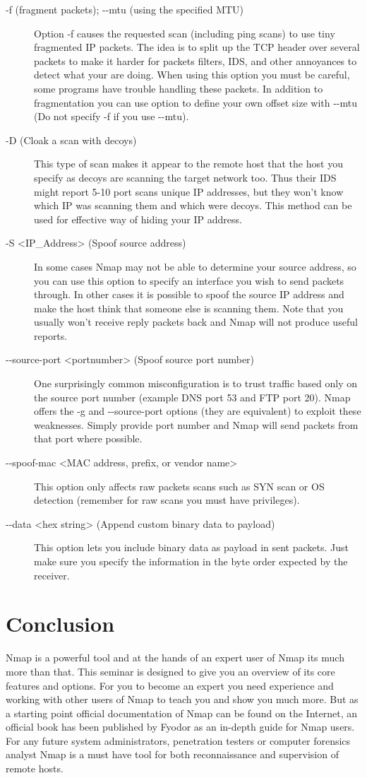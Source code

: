 \documentclass[times, utf8, seminar,english]{fer}
\begin{document}
\begin{description}
	\item [-f (fragment packets); -{}-mtu (using the specified MTU)] Option -f causes the requested scan (including ping scans) to use tiny fragmented IP packets. The idea is to split up the TCP header over several packets to make it harder for packets filters, IDS, and other annoyances to detect what your are doing. When using this option you must be careful, some programs have trouble handling these packets. In addition to fragmentation you can use option to define your own offset size with -{}-mtu (Do not specify -f if you use -{}-mtu). 
	\item [-D (Cloak a scan with decoys)] This type of scan makes it appear to the remote host that the host you specify as decoys are scanning the target network too. Thus their IDS might report 5-10 port scans unique IP addresses, but they won't know which IP was scanning them and which were decoys. This method can be used for effective way of hiding your IP address.
	\item [-S <IP\_Address> (Spoof source address)] In some cases Nmap may not be able to determine your source address, so you can use this option to specify an interface you wish to send packets through. In other cases it is possible to spoof the source IP address and make the host think that someone else is scanning them. Note that you usually won't receive reply packets back and Nmap will not produce useful reports.
	\item [-{}-source-port <portnumber> (Spoof source port number)] One surprisingly common misconfiguration is to trust traffic based only on the source port number (example DNS port 53 and FTP port 20). Nmap offers the -g and -{}-source-port options (they are equivalent) to exploit these weaknesses. Simply provide port number and Nmap will send packets from that port where possible.
	\item [-{}-spoof-mac <MAC address, prefix, or vendor name>] This option only affects raw packets scans such as SYN scan or OS detection (remember for raw scans you must have privileges).
	\item [-{}-data <hex string> (Append custom binary data to payload)] This option lets you include binary data as payload in sent packets. Just make sure you specify the information in the byte order expected by the receiver.
\end{description}

\chapter{Conclusion}
Nmap is a powerful tool and at the hands of an expert user of Nmap its much more than that. This seminar is designed to give you an overview of its core features and options. For you to become an expert you need experience and working with other users of Nmap to teach you and show you much more. But as a starting point official documentation of Nmap can be found on the Internet, an official book has been published by Fyodor as an in-depth guide for Nmap users. For any future system administrators, penetration testers or computer forensics analyst Nmap is a must have tool for both reconnaissance and supervision of remote hosts. 



\end{document}
